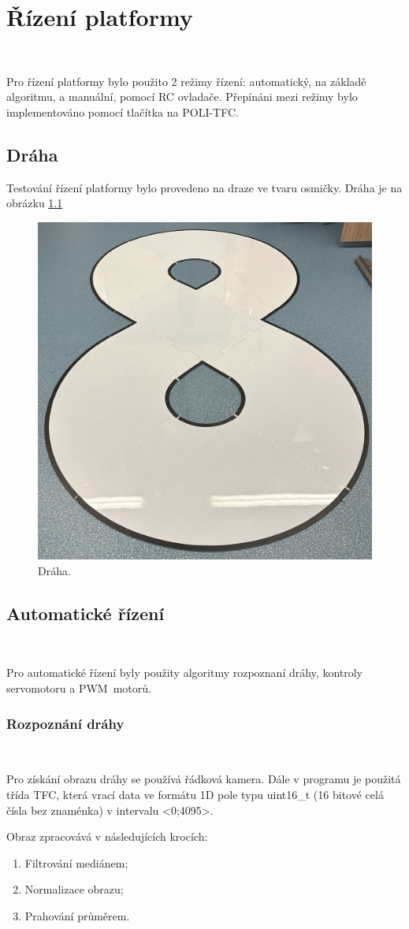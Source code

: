 \chapter{Řízení platformy}
\label{sec:PlatformControl}
\

Pro řízení platformy bylo použito 2 režimy řízení: automatický,
na základě algoritmu, a manuální, pomocí RC ovladače.
Přepínáni mezi režimy bylo implementováno
pomocí tlačítka na POLI-TFC.

\section{Dráha}
Testování řízení platformy bylo provedeno na draze ve tvaru osmičky.
Dráha je na obrázku \ref{fig:Road}

\begin{figure}[!h]
    \centering
    \includegraphics[width = 0.5\linewidth]{Figures/Road.png}
    \caption{Dráha.}
    \label{fig:Road}
\end{figure}

\section{Automatické řízení}\

Pro automatické řízení byly použity algoritmy rozpoznaní dráhy,
kontroly servomotoru a PWM~motorů.

\subsection{Rozpoznání dráhy}\

Pro získání obrazu dráhy se používá řádková kamera. Dále v programu
je použitá třída TFC\cite{draha}, která vrací data ve formátu 1D pole
typu uint16\_t (16 bitové celá čísla bez znaménka) v intervalu <0;4095>.

Obraz zpracovává v následujících krocích:
\begin{enumerate}
    \item Filtrování mediánem;
    \item Normalizace obrazu;
    \item Prahování průměrem.
\end{enumerate}

